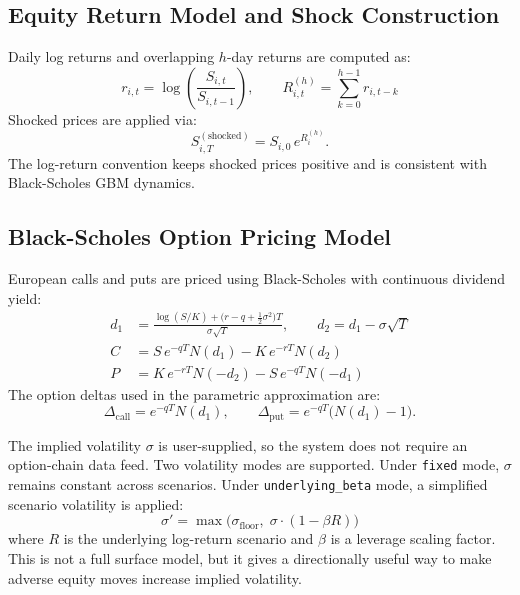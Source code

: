 \documentclass[11pt]{article}
\newcommand{\code}[1]{\texttt{#1}}
\begin{document}
\subsection{Equity Return Model and Shock Construction}

Daily log returns and overlapping $h$-day returns are computed as:
\begin{equation}
  r_{i,t} = \log\!\left(\frac{S_{i,t}}{S_{i,t-1}}\right),
  \qquad
  R_{i,t}^{(h)} = \sum_{k=0}^{h-1} r_{i,t-k}
  \label{eq:returns}
\end{equation}
Shocked prices are applied via:
\begin{equation}
  S_{i,T}^{(\text{shocked})} = S_{i,0}\,e^{R_i^{(h)}}.
\end{equation}
The log-return convention keeps shocked prices positive and is consistent
with Black-Scholes GBM dynamics.

\subsection{Black-Scholes Option Pricing Model}
\label{sec:bs}

European calls and puts are priced using Black-Scholes with continuous
dividend yield:
\begin{align}
  d_1 &= \frac{\log(S/K) + \bigl(r - q + \tfrac{1}{2}\sigma^2\bigr)T}
              {\sigma\sqrt{T}},
  \qquad d_2 = d_1 - \sigma\sqrt{T}
  \label{eq:bs_d1d2}\\[6pt]
  C   &= S\,e^{-qT} N(d_1) - K\,e^{-rT} N(d_2)
  \label{eq:bs_call}\\[4pt]
  P   &= K\,e^{-rT} N(-d_2) - S\,e^{-qT} N(-d_1)
  \label{eq:bs_put}
\end{align}
The option deltas used in the parametric approximation are:
\begin{equation}
  \Delta_{\mathrm{call}} = e^{-qT} N(d_1),
  \qquad
  \Delta_{\mathrm{put}}  = e^{-qT}\bigl(N(d_1) - 1\bigr).
  \label{eq:bs_delta}
\end{equation}

The implied volatility $\sigma$ is user-supplied, so the system does not
require an option-chain data feed.  Two volatility modes are supported.
Under \code{fixed} mode, $\sigma$ remains constant across scenarios.  Under
\code{underlying\_beta} mode, a simplified scenario volatility is applied:
\begin{equation}
  \sigma'= \max\!\bigl(\sigma_{\mathrm{floor}},\; \sigma \cdot (1 - \beta R)\bigr)
  \label{eq:vol_shock}
\end{equation}
where $R$ is the underlying log-return scenario and $\beta$ is a leverage
scaling factor.  This is not a full surface model, but it gives a
directionally useful way to make adverse equity moves increase implied
volatility.
\end{document}
